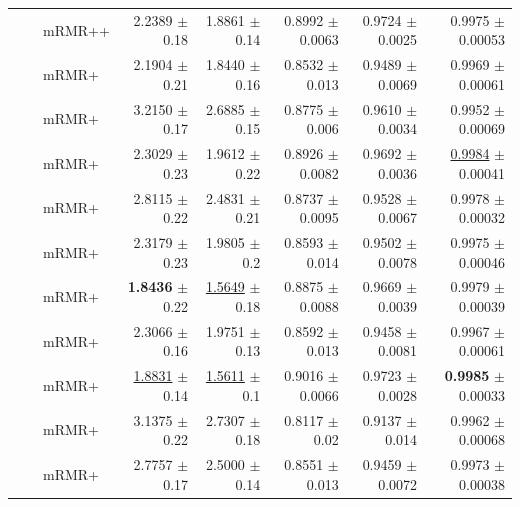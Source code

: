 \begin{longtable}{llp{}rrrrr}
 &  & mRMR++ & 2.2389 {\scriptsize $\pm$ 0.18} & 1.8861 {\scriptsize $\pm$ 0.14} & 0.8992 {\scriptsize $\pm$ 0.0063} & 0.9724 {\scriptsize $\pm$ 0.0025} & 0.9975 {\scriptsize $\pm$ 0.00053} \\
 &  & mRMR+ & 2.1904 {\scriptsize $\pm$ 0.21} & 1.8440 {\scriptsize $\pm$ 0.16} & 0.8532 {\scriptsize $\pm$ 0.013} & 0.9489 {\scriptsize $\pm$ 0.0069} & 0.9969 {\scriptsize $\pm$ 0.00061} \\
 &  & mRMR+ & 3.2150 {\scriptsize $\pm$ 0.17} & 2.6885 {\scriptsize $\pm$ 0.15} & 0.8775 {\scriptsize $\pm$ 0.006} & 0.9610 {\scriptsize $\pm$ 0.0034} & 0.9952 {\scriptsize $\pm$ 0.00069} \\
 &  & mRMR+ & 2.3029 {\scriptsize $\pm$ 0.23} & 1.9612 {\scriptsize $\pm$ 0.22} & 0.8926 {\scriptsize $\pm$ 0.0082} & 0.9692 {\scriptsize $\pm$ 0.0036} & \underline{0.9984} {\scriptsize $\pm$ 0.00041} \\
 &  & mRMR+ & 2.8115 {\scriptsize $\pm$ 0.22} & 2.4831 {\scriptsize $\pm$ 0.21} & 0.8737 {\scriptsize $\pm$ 0.0095} & 0.9528 {\scriptsize $\pm$ 0.0067} & 0.9978 {\scriptsize $\pm$ 0.00032} \\
 &  & mRMR+ & 2.3179 {\scriptsize $\pm$ 0.23} & 1.9805 {\scriptsize $\pm$ 0.2} & 0.8593 {\scriptsize $\pm$ 0.014} & 0.9502 {\scriptsize $\pm$ 0.0078} & 0.9975 {\scriptsize $\pm$ 0.00046} \\
 &  & mRMR+ & \textbf{1.8436} {\scriptsize $\pm$ 0.22} & \underline{1.5649} {\scriptsize $\pm$ 0.18} & 0.8875 {\scriptsize $\pm$ 0.0088} & 0.9669 {\scriptsize $\pm$ 0.0039} & 0.9979 {\scriptsize $\pm$ 0.00039} \\
 &  & mRMR+ & 2.3066 {\scriptsize $\pm$ 0.16} & 1.9751 {\scriptsize $\pm$ 0.13} & 0.8592 {\scriptsize $\pm$ 0.013} & 0.9458 {\scriptsize $\pm$ 0.0081} & 0.9967 {\scriptsize $\pm$ 0.00061} \\
 &  & mRMR+ & \underline{1.8831} {\scriptsize $\pm$ 0.14} & \underline{1.5611} {\scriptsize $\pm$ 0.1} & 0.9016 {\scriptsize $\pm$ 0.0066} & 0.9723 {\scriptsize $\pm$ 0.0028} & \textbf{0.9985} {\scriptsize $\pm$ 0.00033} \\
 &  & mRMR+ & 3.1375 {\scriptsize $\pm$ 0.22} & 2.7307 {\scriptsize $\pm$ 0.18} & 0.8117 {\scriptsize $\pm$ 0.02} & 0.9137 {\scriptsize $\pm$ 0.014} & 0.9962 {\scriptsize $\pm$ 0.00068} \\
 &  & mRMR+ & 2.7757 {\scriptsize $\pm$ 0.17} & 2.5000 {\scriptsize $\pm$ 0.14} & 0.8551 {\scriptsize $\pm$ 0.013} & 0.9459 {\scriptsize $\pm$ 0.0072} & 0.9973 {\scriptsize $\pm$ 0.00038} \\

\end{longtable}
